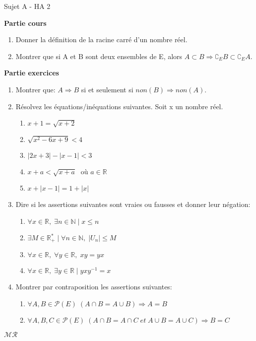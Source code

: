 \documentclass[a4paper,11pt, landscape]{article}
\begin{document}
\begin{multicols*}{3}
\setlength{\columnsep}{1cm}
\centerline{Sujet A - HA 2}
\begin{flushleft}
  \textbf{Partie cours} 
\end{flushleft} 
\begin{enumerate}
  \item Donner la définition de la racine carré d'un nombre réel.
  \item Montrer que si A et B sont deux ensembles de E, alors $A \subset B \Rightarrow \complement_E{B} \subset \complement_E{A}$.
\end{enumerate}
\textbf{Partie exercices}
\begin{enumerate}
  \item Montrer que: $A \Rightarrow B$ si et seulement si  $non (B) \Rightarrow non(A)$.
  \item Résolvez les équations/inéquations suivantes. Soit x un nombre réel.
  \begin{enumerate}
    \item $x+1 = \sqrt{x+2}$
    \item $\sqrt{x^2 - 6x + 9} < 4$
    \item $|2x+3| - |x-1| < 3$
    \item $x+a < \sqrt{x+a}\;$ où $a \in \mathbb{R}$
    \item $x+|x-1| = 1 + |x|$
  \end{enumerate}
  \item Dire si les assertions suivantes sont vraies ou fausses et donner leur négation:
  \begin{enumerate}
    \item $\forall x \in \mathbb{R}, \; \exists n \in \mathbb{N} \; | \;x \leq n$
    \item $\exists M \in \mathbb{R_+^*} \; | \; \forall n \in \mathbb{N}, \;|U_n| \leq M$
    \item $\forall x \in \mathbb{R}, \; \forall y \in \mathbb{R}, \; xy = yx$
    \item $\forall x \in \mathbb{R}, \; \exists y \in \mathbb{R} \; | \; yxy^{-1} = x$
  \end{enumerate}
  \item Montrer par contraposition les assertions suivantes:
  \begin{enumerate}
    \item $\forall A, B \in \mathcal{P}(E) \; (A \cap B = A \cup B) \Rightarrow A = B$
    \item $\forall A, B, C \in \mathcal{P}(E) \; (A \cap B = A \cap C \; et \; A \cup B  = A \cup C) \Rightarrow B = C$
  \end{enumerate}
\end{enumerate}
\centerline{$\mathcal{MR}$}


\end{multicols*}
\end{document}
